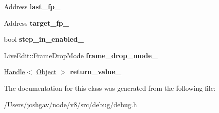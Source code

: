 \begin{DoxyCompactItemize}
\item 
Address {\bfseries last\+\_\+fp\+\_\+}\hypertarget{classv8_1_1internal_1_1_debug_1_1_thread_local_a9b7574af2e67d7ab31308f9c156f5bdb}{}\label{classv8_1_1internal_1_1_debug_1_1_thread_local_a9b7574af2e67d7ab31308f9c156f5bdb}

\item 
Address {\bfseries target\+\_\+fp\+\_\+}\hypertarget{classv8_1_1internal_1_1_debug_1_1_thread_local_af05fc51f5357a908becd3a0f8db7485b}{}\label{classv8_1_1internal_1_1_debug_1_1_thread_local_af05fc51f5357a908becd3a0f8db7485b}

\item 
bool {\bfseries step\+\_\+in\+\_\+enabled\+\_\+}\hypertarget{classv8_1_1internal_1_1_debug_1_1_thread_local_a721b326fac4a50108ff8f1647dd75476}{}\label{classv8_1_1internal_1_1_debug_1_1_thread_local_a721b326fac4a50108ff8f1647dd75476}

\item 
Live\+Edit\+::\+Frame\+Drop\+Mode {\bfseries frame\+\_\+drop\+\_\+mode\+\_\+}\hypertarget{classv8_1_1internal_1_1_debug_1_1_thread_local_a7a06c7fec48ae9575a58993df304b1b5}{}\label{classv8_1_1internal_1_1_debug_1_1_thread_local_a7a06c7fec48ae9575a58993df304b1b5}

\item 
\hyperlink{classv8_1_1internal_1_1_handle}{Handle}$<$ \hyperlink{classv8_1_1internal_1_1_object}{Object} $>$ {\bfseries return\+\_\+value\+\_\+}\hypertarget{classv8_1_1internal_1_1_debug_1_1_thread_local_ae7e6fc694c6acbd1d98eaa04ecf66825}{}\label{classv8_1_1internal_1_1_debug_1_1_thread_local_ae7e6fc694c6acbd1d98eaa04ecf66825}

\end{DoxyCompactItemize}


The documentation for this class was generated from the following file\+:\begin{DoxyCompactItemize}
\item 
/\+Users/joshgav/node/v8/src/debug/debug.\+h\end{DoxyCompactItemize}

